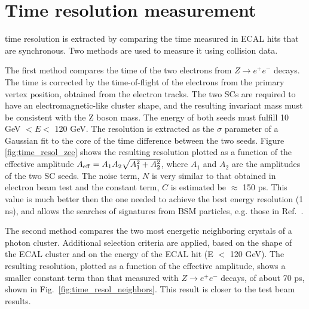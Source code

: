 \documentclass[journal]{IEEEtran}
\begin{document}
\section{Time resolution measurement}
\label{sec:timeresolution}
 time resolution is extracted by comparing the time measured in ECAL hits that are synchronous. Two methods are used to measure it using collision data.

The first method compares the time of the two electrons from $Z\to e^+e^-$ decays. The time is corrected by the time-of-flight of the electrons from the primary vertex position, obtained from the electron tracks. The two SCs are required to have an electromagnetic-like cluster shape, and the resulting invariant mass must be consistent with the Z boson mass. The energy of both seeds must fulfill 10 GeV $<E<$ 120 GeV. The resolution is extracted as the $\sigma$ parameter of a Gaussian fit to the core of the time difference between the two seeds. Figure \ref{fig:time_resol_zee} shows the resulting resolution plotted as a function of the effective amplitude $A_{\rm eff} = A_1 A_2 \sqrt{A_1^2 + A_2^2}$, where $A_1$ and $A_2$ are the amplitudes of the two SC seeds. The noise term, $N$ is very similar to that obtained in electron beam test and the constant term, $C$ is estimated be $\approx$ 150 ps. This value is much better then the one needed to achieve the best energy resolution (1 ns), and allows the searches of signatures from BSM particles, e.g. those in Ref.~\cite{Chatrchyan:2012ir}. 

The second method compares the two most energetic neighboring crystals of a photon cluster. Additional selection criteria are applied, based on the shape of the ECAL cluster and on the energy of the ECAL hit (E $<$ 120 GeV). The resulting resolution, plotted as a function of the effective amplitude, shows a smaller constant term than that measured with $Z\to e^+e^-$ decays, of about 70 ps, shown in Fig.~\ref{fig:time_resol_neighbors}. This result is closer to the test beam results.
\end{document}

